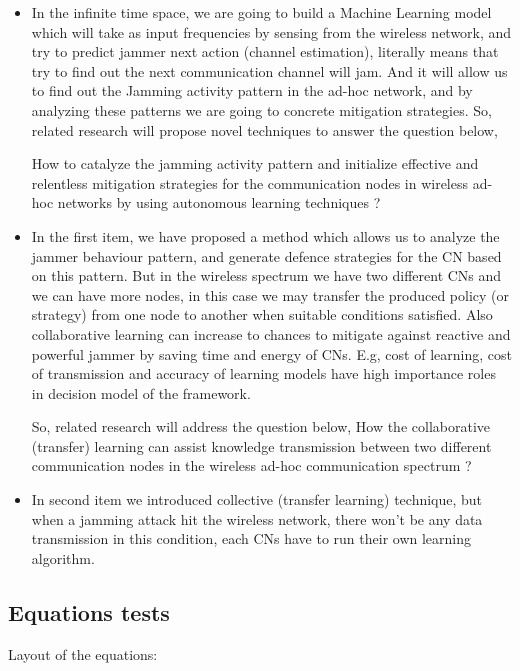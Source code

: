 \documentclass[letterpaper%
, twoside%
, 12pt%
,thesepararticles%
, english%
,creativecommons,hyperref, withAlgo2e%
]{thETS}
\begin{document}
\begin{itemize}
 \item {In the infinite time space, we are going to build a Machine Learning model which will take as input frequencies by sensing from the wireless network, and try to predict jammer next action (channel estimation), literally means that try to find out the next communication channel will jam. And it will allow us to find out the Jamming activity pattern in the ad-hoc network, and by analyzing these patterns we are going to concrete  mitigation strategies. So, related research will propose novel techniques to answer the question below,
     
     How to catalyze the jamming activity pattern and initialize effective and relentless mitigation strategies for the communication nodes in wireless ad-hoc networks by using autonomous learning techniques ?}
 \item {In the first item, we have proposed a method which allows us to analyze the jammer behaviour pattern, and generate defence strategies for the CN based on this pattern. But in the wireless spectrum we have two different CNs and we can have more nodes, in this case we may transfer the produced policy (or strategy) from one node to another when suitable conditions satisfied. Also collaborative learning can increase to chances to mitigate against reactive and powerful jammer by saving time and energy of CNs. E.g, cost of learning, cost of transmission and accuracy of learning models have  high importance roles in decision model of the framework. 
  
 	So, related research will address the question below, 
 	How the collaborative (transfer) learning can assist knowledge transmission between two different communication nodes in the wireless ad-hoc communication spectrum ? 
 }

 \item{In second item we introduced collective (transfer learning) technique, but when a jamming attack hit the wireless network, there won't be any data transmission in this condition, each CNs have to run their own learning algorithm. } 
 
 \end{itemize}


\subsection{Equations tests}

Layout of the equations:
\end{document}
